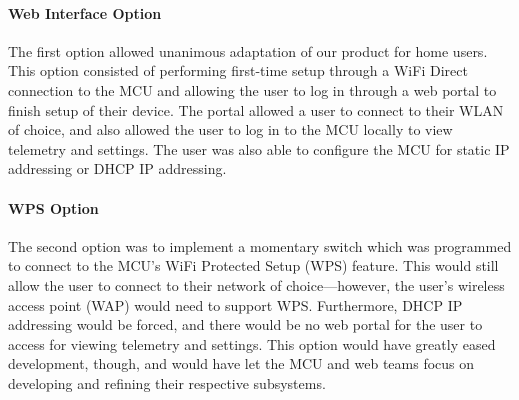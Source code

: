 \paragraph{Web Interface Option}
The first option allowed unanimous adaptation of our product for home users. This option consisted of performing first-time setup through a WiFi Direct connection to the MCU and allowing the user to log in through a web portal to finish setup of their device. The portal allowed a user to connect to their WLAN of choice, and also allowed the user to log in to the MCU locally to view telemetry and settings. The user was also able to configure the MCU for static IP addressing or DHCP IP addressing.

\paragraph{WPS Option}
The second option was to implement a momentary switch which was
programmed to connect to the MCU's WiFi Protected Setup (WPS) feature.
This would still allow the user to connect to their network of
choice---however, the user's wireless access point (WAP) would need to
support WPS. Furthermore, DHCP IP addressing would be forced, and there
would be no web portal for the user to access for viewing telemetry and
settings. This option would have greatly eased development, though, and would
have let the MCU and web teams focus on developing and refining their
respective subsystems.

